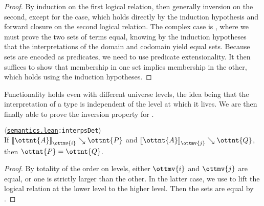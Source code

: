 \documentclass[a4paper,UKenglish,cleveref,autoref,thm-restate]{lipics-v2021}
\newcommand{\repo}{https://github.com/ionathanch/TTBFL}
\newcommand{\thmref}[2]{%
  $\langle$\href{\repo/tree/main/src/#1}{\texttt{#1}}\texttt{:#2}$\rangle$%
}
\begin{document}
\begin{proof}
  By induction on the first logical relation,
  then generally inversion on the second,
  except for the  case,
  which holds directly by the induction hypothesis
  and forward closure on the second logical relation.
  The complex case is ,
  where we must prove the two sets of terms equal,
  knowing by the induction hypotheses
  that the interpretations of the domain and codomain yield equal sets.
  Because sets are encoded as predicates,
  we need to use predicate extensionality.
  It then suffices to show that membership in one set implies membership in the other,
  which holds using the induction hypotheses.
\end{proof}

Functionality holds even with different universe levels,
the idea being that the interpretation of a type is independent
of the level at which it lives.
We are then finally able to prove the inversion property for .

\begin{lemma}[Functionality (l.r.)] \thmref{semantics.lean}{interpsDet} \label{lem:lr:func} \\
  If $ \mathopen{\llbracket}  \ottnt{A}  \mathclose{\rrbracket}_{ \ottmv{i} } \searrow  \ottnt{P} $ and $ \mathopen{\llbracket}  \ottnt{A}  \mathclose{\rrbracket}_{ \ottmv{j} } \searrow  \ottnt{Q} $, then $\ottnt{P} = \ottnt{Q}$.
\end{lemma}

\begin{proof}
  By totality of the order on levels,
  either $\ottmv{i}$ and $\ottmv{j}$ are equal,
  or one is strictly larger than the other.
  In the latter case,
  we use  to lift the logical relation at the lower level to the higher level.
  Then the sets are equal by .
\end{proof}
\end{document}
